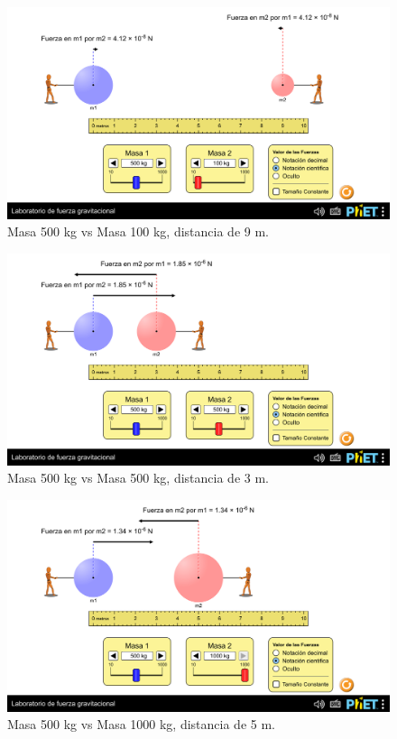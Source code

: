 \documentclass[a4paper,12pt]{article}
\begin{document}
\begin{figure}[h]
    \centering
    \includegraphics[width=1\linewidth]{m1_500_m2_100_r_9.png}
    \caption{Masa 500 kg vs Masa 100 kg, distancia de 9 m.}
\end{figure}

\begin{figure}[h]
    \centering
    \includegraphics[width=1\linewidth]{m1_500_m2_500_r_3.png}
    \caption{Masa 500 kg vs Masa 500 kg, distancia de 3 m.}
\end{figure}

\begin{figure}[h]
    \centering
    \includegraphics[width=1\linewidth]{m1_500_m2_1000_r_5.png}
    \caption{Masa 500 kg vs Masa 1000 kg, distancia de 5 m.}
\end{figure}
\end{document}
